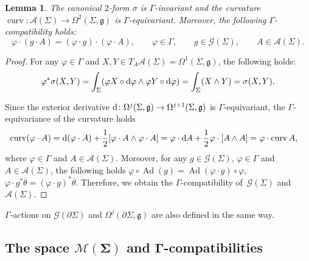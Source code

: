 \documentclass[10pt,a4paper]{amsart}
\numberwithin{equation}{section}
\newtheorem{Lemma}[Theorem]{Lemma}
\theoremstyle{definition}
\newcommand{\Ad}{\operatorname{Ad}}
\newcommand{\curv}{\operatorname{curv}}
\begin{document}
\begin{Lemma}\label{lemm of compati for conn}
 The canonical $2$-form $\sigma$ is $\Gamma$-invariant and the curvature $\curv \colon \mathcal{A}(\Sigma) \to \Omega^{2}(\Sigma,\mathfrak{g})$ is $\Gamma$-equivariant.
 Moreover, the following $\Gamma$-compatibility holds:
 \[
 \varphi \cdot (g \cdot A) = (\varphi \cdot g) \cdot (\varphi \cdot A), \qquad \varphi \in \Gamma,\qquad g \in \mathcal{G}(\Sigma),\qquad A \in \mathcal{A}(\Sigma).
 \]
\end{Lemma}

\begin{proof}For any $\varphi \in \Gamma$ and $X, Y \in T_A\mathcal{A}(\Sigma) = \Omega^{1}(\Sigma,\mathfrak{g})$, the following holds:
 \[\varphi^*\sigma(X,Y) = \int_{\Sigma} (\varphi X \circ {\rm d} \varphi \wedge \varphi Y \circ {\rm d} \varphi) = \int_{\Sigma}(X\wedge Y) = \sigma(X,Y).\]

Since the exterior derivative ${\rm d} \colon \Omega^{j}(\Sigma,\mathfrak{g}) \to \Omega^{j+1}(\Sigma,\mathfrak{g})$ is $\Gamma$-equivariant, the $\Gamma$-equivariance of the curvature holds
 \begin{align*}
 \curv(\varphi \cdot A) &= {\rm d}(\varphi \cdot A) + \frac{1}{2}[ \varphi \cdot A \wedge \varphi \cdot A] = \varphi \cdot {\rm d} A + \frac{1}{2}\varphi \cdot [A \wedge A]
 = \varphi \cdot \curv A,
 \end{align*}
 where $\varphi \in \Gamma$ and $A \in \mathcal{A}(\Sigma)$.
 Moreover, for any $g \in \mathcal{G}(\Sigma)$, $\varphi \in \Gamma$ and $A \in \mathcal{A}(\Sigma)$, the following holds
$\varphi \circ \Ad(g) = \Ad(\varphi \cdot g) \circ \varphi$,
$\varphi \cdot g^*\overline{\theta} = (\varphi \cdot g)^* \overline{\theta}$.
 Therefore, we obtain the $\Gamma$-compatibility of~$\mathcal{G}(\Sigma)$ and $\mathcal{A}(\Sigma)$.
\end{proof}

$\Gamma$-actions on $\mathcal{G}(\partial \Sigma)$ and $\Omega^{j}(\partial \Sigma, \mathfrak{g})$ are also defined in the same way.

\subsection[The space M(Sigma) and Gamma-compatibilities]{The space $\boldsymbol{\mathcal{M}(\Sigma)}$ and $\boldsymbol{\Gamma}$-compatibilities}
\end{document}

